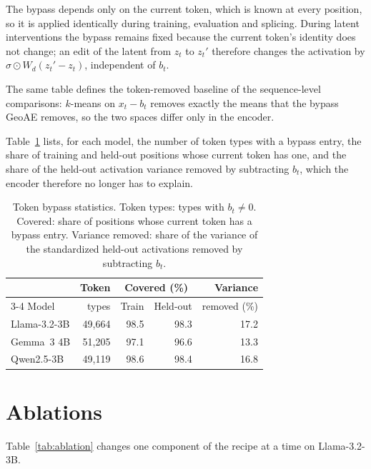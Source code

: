 \documentclass[11pt]{article}
\begin{document}
The bypass depends only on the current token, which is known at every position, so it is applied identically during training, evaluation and splicing. During latent interventions the bypass remains fixed because the current token's identity does not change; an edit of the latent from $z_t$ to $z_t'$ therefore changes the activation by $\sigma \odot W_d (z_t' - z_t)$, independent of $b_t$.

The same table defines the token-removed baseline of the sequence-level comparisons: $k$-means on $x_t - b_t$ removes exactly the means that the bypass GeoAE removes, so the two spaces differ only in the encoder.

Table~\ref{tab:bypass} lists, for each model, the number of token types with a bypass entry, the share of training and held-out positions whose current token has one, and the share of the held-out activation variance removed by subtracting $b_t$, which the encoder therefore no longer has to explain.

\begin{table}[ht]
\centering
\small
\setlength{\tabcolsep}{4pt}
\begin{tabular}{@{}l rrrr@{}}
\toprule
 & Token & \multicolumn{2}{c}{Covered (\%)} & Variance \\
\cmidrule(lr){3-4}
Model & types & Train & Held-out & removed (\%) \\
\midrule
Llama-3.2-3B & 49{,}664 & 98.5 & 98.3 & 17.2 \\
Gemma~3 4B   & 51{,}205 & 97.1 & 96.6 & 13.3 \\
Qwen2.5-3B   & 49{,}119 & 98.6 & 98.4 & 16.8 \\
\bottomrule
\end{tabular}
\caption{Token bypass statistics. Token types: types with $b_t \neq 0$. Covered: share of positions whose current token has a bypass entry. Variance removed: share of the variance of the standardized held-out activations removed by subtracting $b_t$.}
\label{tab:bypass}
\end{table}

\section{Ablations}
\label{app:ablations}

Table~\ref{tab:ablation} changes one component of the recipe at a time on Llama-3.2-3B.
\end{document}
